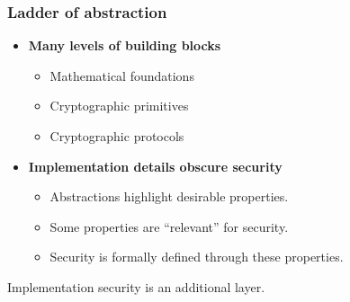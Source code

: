 \begin{frame}
  \frametitle{Ladder of abstraction}

  \pause
  \begin{itemize}
    \item \textbf{Many levels of building blocks}
    \pause
    \begin{itemize}
      \item Mathematical foundations
      \item Cryptographic primitives
      \item Cryptographic protocols
    \end{itemize}

    \vspace*{1em}

    \pause
    \item \textbf{Implementation details obscure security}
    \pause
    \begin{itemize}
      \item Abstractions highlight desirable properties.
      \item Some properties are \enquote{relevant} for security.
      \item Security is formally defined through these properties.
    \end{itemize}
  \end{itemize}

  \vspace*{1em}

  \pause
  Implementation security is an additional layer.
\end{frame}

